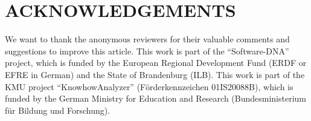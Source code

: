 \documentclass[a4paper,twoside]{article}
\begin{document}
\section*{\uppercase{Acknowledgements}}
\label{sec:acknowledgements}
\noindent
We want to thank the anonymous reviewers for their valuable comments and suggestions to improve this article.
This work is part of the \enquote{Software-DNA} project, which is funded by the European Regional Development Fund (ERDF or EFRE in German) and the State of Brandenburg (ILB).
This work is part of the KMU project \enquote{KnowhowAnalyzer} (Förderkennzeichen 01IS20088B), which is funded by the German Ministry for Education and Research (Bundesministerium für Bildung und Forschung).


{\small
}
\end{document}
